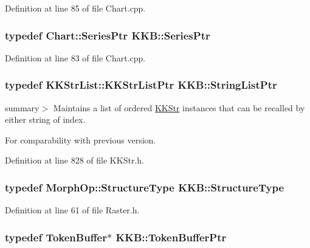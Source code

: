 Definition at line 85 of file Chart.\+cpp.

\subsubsection[{\texorpdfstring{Series\+Ptr}{SeriesPtr}}]{\setlength{\rightskip}{0pt plus 5cm}typedef {\bf Chart\+::\+Series\+Ptr} {\bf K\+K\+B\+::\+Series\+Ptr}}\hypertarget{namespace_k_k_b_afbd510d7c1f234756a7bcbe080f48f45}{}\label{namespace_k_k_b_afbd510d7c1f234756a7bcbe080f48f45}


Definition at line 83 of file Chart.\+cpp.

\subsubsection[{\texorpdfstring{String\+List\+Ptr}{StringListPtr}}]{\setlength{\rightskip}{0pt plus 5cm}typedef {\bf K\+K\+Str\+List\+::\+K\+K\+Str\+List\+Ptr} {\bf K\+K\+B\+::\+String\+List\+Ptr}}\hypertarget{namespace_k_k_b_a8a9b957cedcc26019cc08c75bfc15070}{}\label{namespace_k_k_b_a8a9b957cedcc26019cc08c75bfc15070}


summary$>$ Maintains a list of ordered \hyperlink{class_k_k_b_1_1_k_k_str}{K\+K\+Str} instances that can be recalled by either string of index. 

For comparability with previous version. 

Definition at line 828 of file K\+K\+Str.\+h.

\subsubsection[{\texorpdfstring{Structure\+Type}{StructureType}}]{\setlength{\rightskip}{0pt plus 5cm}typedef {\bf Morph\+Op\+::\+Structure\+Type} {\bf K\+K\+B\+::\+Structure\+Type}}\hypertarget{namespace_k_k_b_a566736d34bed362968fc3667773412f9}{}\label{namespace_k_k_b_a566736d34bed362968fc3667773412f9}


Definition at line 61 of file Raster.\+h.

\subsubsection[{\texorpdfstring{Token\+Buffer\+Ptr}{TokenBufferPtr}}]{\setlength{\rightskip}{0pt plus 5cm}typedef {\bf Token\+Buffer}$\ast$ {\bf K\+K\+B\+::\+Token\+Buffer\+Ptr}}\hypertarget{namespace_k_k_b_ae97804d25124b4a5dba3b3637beb814a}{}\label{namespace_k_k_b_ae97804d25124b4a5dba3b3637beb814a}


